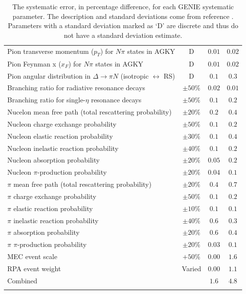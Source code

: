 \begin{longtable}{p{3.25in} c c c}
  Pion transverse momentum ($p_T$) for $N\pi$ states \newline in AGKY & D & $0.01$ & $0.02$ \\
  Pion Feynman x ($x_F$) for $N\pi$ states in AGKY & D & $0.01$ & $0.02$ \\
  Pion angular distribution in $\Delta \rightarrow \pi N$ \newline (isotropic $\leftrightarrow$ RS) & D & $0.1$ & $0.3$ \\
  Branching ratio for radiative resonance decays & $\pm50\%$ & $0.02$ & $0.01$ \\
  Branching ratio for single-$\eta$ resonance decays & $\pm50\%$ & $0.1$ & $0.2$ \\
  Nucelon mean free path (total rescattering \newline probability) & $\pm20\%$ & $0.2$ & $0.4$ \\
  Nucleon charge exchange probability & $\pm50\%$ & $0.1$ & $0.2$ \\
  Nucleon elastic reaction probability & $\pm30\%$ & $0.1$ & $0.4$ \\
  Nucleon inelastic reaction probability & $\pm40\%$ & $0.1$ & $0.2$ \\
  Nucleon absorption probability & $\pm20\%$ & $0.05$ & $0.2$ \\
  Nucleon $\pi$-production probability & $\pm20\%$ & $0.04$ & $0.1$ \\
  $\pi$ mean free path (total rescattering probability) & $\pm20\%$ & $0.4$ & $0.7$ \\
  $\pi$ charge exchange probability & $\pm50\%$ & $0.1$ & $0.2$ \\
  $\pi$ elastic reaction probability & $\pm10\%$ & $0.1$ & $0.1$ \\
  $\pi$ inelastic reaction probability & $\pm40\%$ & $0.6$ & $0.3$ \\
  $\pi$ absorption probability & $\pm20\%$ & $0.6$ & $0.4$ \\
  $\pi$ $\pi$-production probability & $\pm20\%$ & $0.03$ & $0.1$ \\
  MEC event scale & $+50\%$ & $0.00$ & $1.6$ \\
  RPA event weight & Varied & $0.00$ & $1.1$ \\
  \hline
  Combined & & $1.6$ & $4.8$ \\
  \hline
  \caption[GENIE Systematic Errors]{The systematic error, in percentage difference, for each GENIE systematic parameter. The description and standard deviations come from reference \cite{ref:GENIE, ref:TNGENIE}. Parameters with a standard deviation marked as `D' are discrete and thus do not have a standard deviation estimate.}
  \label{tab:SystGENIE}
\end{longtable}
\doublespacing

